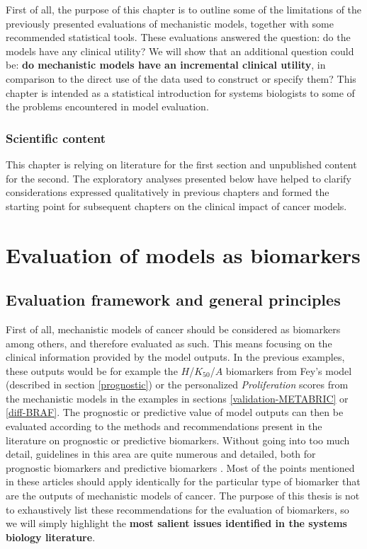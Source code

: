 \documentclass[a4paper,12pt,twoside,onecolumn,openright,final,oldfontcommands]{memoir}
\let\BeginKnitrBlock\begin \let\EndKnitrBlock\end
\begin{document}
First of all, the purpose of this chapter is to outline some of the
limitations of the previously presented evaluations of mechanistic
models, together with some recommended statistical tools. These
evaluations answered the question: do the models have any clinical
utility? We will show that an additional question could be: \textbf{do
mechanistic models have an incremental clinical utility}, in comparison
to the direct use of the data used to construct or specify them? This
chapter is intended as a statistical introduction for systems biologists
to some of the problems encountered in model evaluation.

\BeginKnitrBlock{summarybox}
\subsubsection*{Scientific content}\label{scientific-content-4}

This chapter is relying on literature for the first section and
unpublished content for the second. The exploratory analyses presented
below have helped to clarify considerations expressed qualitatively in
previous chapters and formed the starting point for subsequent chapters
on the clinical impact of cancer models.
\EndKnitrBlock{summarybox}

\section{Evaluation of models as
biomarkers}\label{evaluation-of-models-as-biomarkers}

\subsection{Evaluation framework and general
principles}\label{evaluation-framework-and-general-principles}

First of all, mechanistic models of cancer should be considered as
biomarkers among others, and therefore evaluated as such. This means
focusing on the clinical information provided by the model outputs. In
the previous examples, these outputs would be for example the
\(H\)/\(K_{50}\)/\(A\) biomarkers from Fey's model (described in section
\ref{prognostic}) or the personalized \emph{Proliferation} scores from
the mechanistic models in the examples in sections
\ref{validation-METABRIC} or \ref{diff-BRAF}. The prognostic or
predictive value of model outputs can then be evaluated according to the
methods and recommendations present in the literature on prognostic or
predictive biomarkers. Without going into too much detail, guidelines in
this area are quite numerous and detailed, both for prognostic
biomarkers \citep{mcshane2005reporting, sauerbrei2018reporting} and
predictive biomarkers \citep{janes2014approach}. Most of the points
mentioned in these articles should apply identically for the particular
type of biomarker that are the outputs of mechanistic models of cancer.
The purpose of this thesis is not to exhaustively list these
recommendations for the evaluation of biomarkers, so we will simply
highlight the \textbf{most salient issues identified in the systems
biology literature}.
\end{document}
